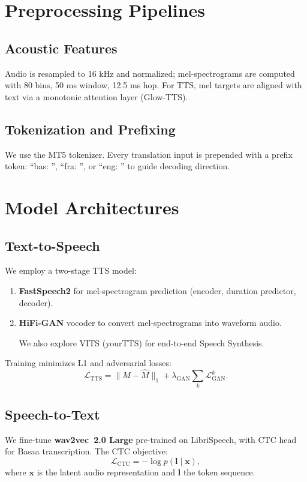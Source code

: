 \documentclass[11pt,a4paper]{article}
\begin{document}
\section{Preprocessing Pipelines}
\subsection{Acoustic Features}
Audio is resampled to 16 kHz and normalized; mel-spectrograms are computed with 80 bins, 50 ms window, 12.5 ms hop. For TTS, mel targets are aligned with text via a monotonic attention layer (Glow-TTS)\cite{kim2020glowtts}.

\subsection{Tokenization and Prefixing}
We use the MT5 tokenizer\cite{xue2020mt5}. Every translation input is prepended with a prefix token: ``bas: '', ``fra: '', or ``eng: '' to guide decoding direction\cite{raffel2020t5}.

\section{Model Architectures}
\subsection{Text-to-Speech}
We employ a two-stage TTS model:
\begin{enumerate}
  \item \textbf{FastSpeech2} for mel-spectrogram prediction (encoder, duration predictor, decoder)\cite{ren2020fastspeech}.
  \item \textbf{HiFi-GAN} vocoder to convert mel-spectrograms into waveform audio\cite{kim2020hifigan}.
  
  We also explore VITS (yourTTS) for end-to-end Speech Synthesis.
\end{enumerate}
Training minimizes L1 and adversarial losses:
\begin{equation}
  \mathcal{L}_{\mathrm{TTS}} = \|M - \hat{M}\|_1 + \lambda_{\mathrm{GAN}} \sum_{k} \mathcal{L}_{\mathrm{GAN}}^k.
\end{equation}

\subsection{Speech-to-Text}
We fine-tune \textbf{wav2vec~2.0 Large} pre-trained on LibriSpeech, with CTC head for Basaa transcription. The CTC objective:
\begin{equation}
  \mathcal{L}_{\mathrm{CTC}} = -\log p(\mathbf{l} \mid \mathbf{x}),
\end{equation}
where $\mathbf{x}$ is the latent audio representation and $\mathbf{l}$ the token sequence\cite{baevski2020wav2vec2}.
\end{document}
